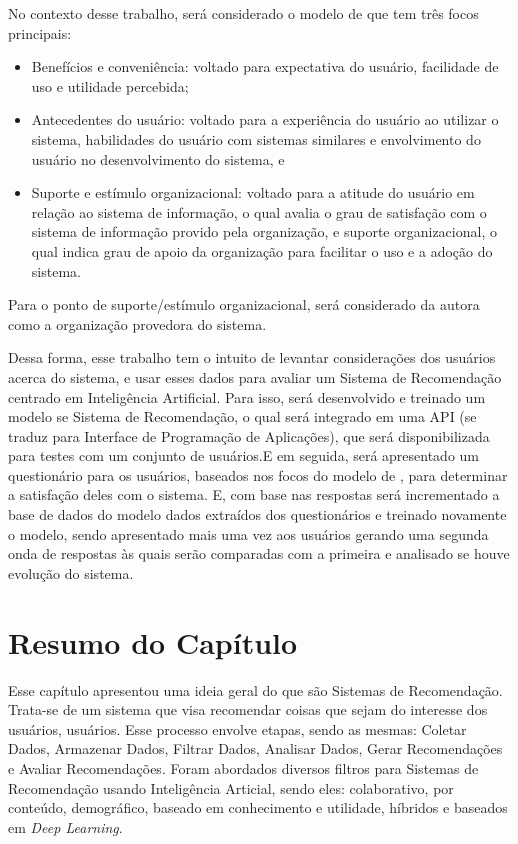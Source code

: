 No contexto desse trabalho, será considerado o modelo de  que tem três focos principais:
\begin{itemize}
    \item Benefícios e conveniência: voltado para expectativa do usuário, facilidade de uso e utilidade percebida;
    \item Antecedentes do usuário: voltado para a experiência do usuário ao utilizar o sistema, 
    habilidades do usuário com sistemas similares e envolvimento do 
    usuário no desenvolvimento do sistema, e
    \item Suporte e estímulo organizacional: voltado para a atitude do usuário em relação ao sistema de informação, o qual
    avalia o grau de satisfação com o sistema de informação provido pela organização,    
    e suporte organizacional, o qual indica grau de apoio da organização para facilitar o uso e a adoção do sistema.
\end{itemize}
Para o ponto de suporte/estímulo organizacional, será considerado da autora como a organização provedora do sistema.

Dessa forma, esse trabalho tem o intuito de levantar considerações dos usuários acerca do sistema, e usar esses
dados para avaliar um Sistema de Recomendação centrado em Inteligência Artificial. Para isso, será desenvolvido e treinado um
modelo se Sistema de Recomendação, o qual será integrado em uma API (se traduz para Interface de Programação de Aplicações), que
será disponibilizada para testes com um conjunto de usuários.E em seguida, será apresentado um questionário para os usuários,
baseados nos focos do modelo de , para determinar a satisfação deles com o sistema. E, com base 
nas respostas será incrementado a base de dados do modelo dados extraídos dos questionários e treinado novamente o modelo, 
sendo apresentado mais uma vez aos usuários gerando uma segunda onda de respostas às quais serão comparadas com
a primeira e analisado se houve evolução do sistema.

\section{Resumo do Capítulo}\label{sec:resrefteor}

Esse capítulo apresentou uma ideia geral do que são Sistemas de Recomendação. Trata-se de um sistema que visa recomendar coisas que 
sejam do interesse dos usuários, usuários. Esse processo envolve etapas, sendo as mesmas: Coletar Dados, 
Armazenar Dados, Filtrar Dados, Analisar Dados, Gerar Recomendações e Avaliar Recomendações. 
Foram abordados diversos filtros para Sistemas de Recomendação usando Inteligência 
Articial, sendo eles: colaborativo, por conteúdo, demográfico, baseado em conhecimento e utilidade, híbridos e baseados em
\textit{Deep Learning}.

